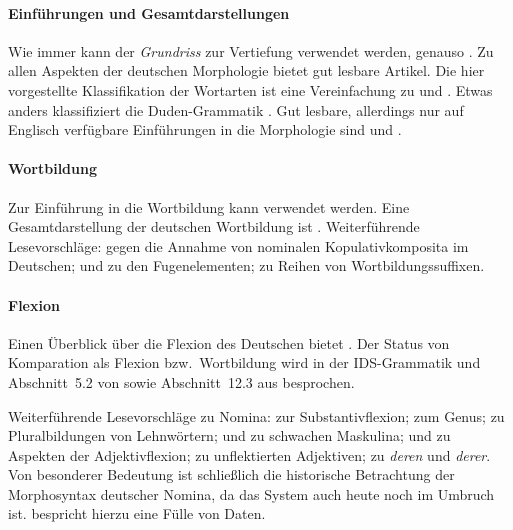 \begin{sloppypar}

\paragraph*{Einführungen und Gesamtdarstellungen}

Wie immer kann der \textit{Grundriss} \citep{Eisenberg1} zur Vertiefung verwendet werden, genauso \citet{Engel09}.
Zu allen Aspekten der deutschen Morphologie bietet \citet{HentschelVogel2009} gut lesbare Artikel.
Die hier vorgestellte Klassifikation der Wortarten ist eine Vereinfachung zu \citet{Engel09a} und \citet{Engel09}.
Etwas anders klassifiziert die Duden-Grammatik \citep{Duden8}.
Gut lesbare, allerdings nur auf Englisch verfügbare Einführungen in die Morphologie sind \citet{Katamba06} und \citet{Booj2007}.

\paragraph*{Wortbildung}

Zur Einführung in die Wortbildung kann \citet{Altmann2011} verwendet werden.
Eine Gesamtdarstellung der deutschen Wortbildung ist \citet{FB95}.
Weiterführende Lesevorschläge: 
\citet{BTh92} gegen die Annahme von nominalen Kopulativkomposita im Deutschen;
\citet{Gallmann1999} und \citet{NueblingSzczepaniak2009} zu den Fugenelementen;
\citet{EisenbergSayatz2002} zu Reihen von Wortbildungssuffixen.

\paragraph*{Flexion}

Einen Überblick über die Flexion des Deutschen bietet \citet{ThieroffVogel2009}.
Der Status von Komparation als Flexion bzw.\ Wortbildung wird \zB in der IDS-Grammatik \citep[47f.]{IDS} und Abschnitt~5.2 von \citet{Eisenberg1} sowie Abschnitt~12.3 aus \citet{Eisenberg2} besprochen.

Weiterführende Lesevorschläge zu Nomina:
\citet{Wiese2012} zur Substantivflexion;
\citet{KoepckeZubin1995} zum Genus;
\citet{Wegener2004} zu Pluralbildungen von Lehnwörtern;
\citet{Koepcke1995} und \citet{Thieroff2003} zu schwachen Maskulina;
\citet{Wiese2009} und \citet{Nuebling2011} zu Aspekten der Adjektivflexion;
\citet{Vogel1997} zu unflektierten Adjektiven;
\citet{Baerentzen2002} zu \textit{deren} und \textit{derer}.
Von besonderer Bedeutung ist schließlich die historische Betrachtung der Morphosyntax deutscher Nomina, da das System auch heute noch im Umbruch ist.
\citet{Demske00} bespricht hierzu eine Fülle von Daten.


\end{sloppypar}
